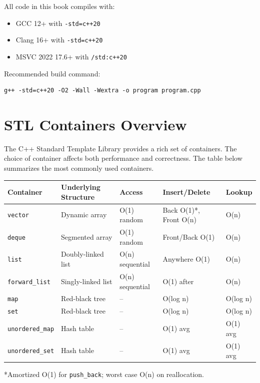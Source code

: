 All code in this book compiles with:

\begin{itemize}
\item GCC 12+ with \texttt{-std=c++20}
\item Clang 16+ with \texttt{-std=c++20}
\item MSVC 2022 17.6+ with \texttt{/std:c++20}
\end{itemize}

Recommended build command:

\begin{lstlisting}
g++ -std=c++20 -O2 -Wall -Wextra -o program program.cpp
\end{lstlisting}

\section{STL Containers Overview}

The C++ Standard Template Library provides a rich set of containers. The choice of container affects both performance and correctness. The table below summarizes the most commonly used containers.

\begin{center}
\begin{tabular}{lllll}
\toprule
Container & Underlying Structure & Access & Insert/Delete & Lookup \\
\midrule
\texttt{vector} & Dynamic array & O(1) random & Back O(1)*, Front O(n) & O(n) \\
\texttt{deque} & Segmented array & O(1) random & Front/Back O(1) & O(n) \\
\texttt{list} & Doubly-linked list\index{linked list} & O(n) sequential & Anywhere O(1) & O(n) \\
\texttt{forward\_list} & Singly-linked list & O(n) sequential & O(1) after & O(n) \\
\texttt{map} & Red-black tree\index{tree} & -- & O(log n) & O(log n) \\
\texttt{set} & Red-black tree & -- & O(log n) & O(log n) \\
\texttt{unordered\_map} & Hash table\index{hash table} & -- & O(1) avg & O(1) avg \\
\texttt{unordered\_set} & Hash table & -- & O(1) avg & O(1) avg \\
\bottomrule
\end{tabular}
\end{center}

*Amortized O(1) for \texttt{push\_back}; worst case O(n) on reallocation.

